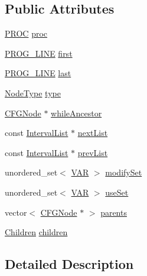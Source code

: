 \subsection*{Public Attributes}
\begin{DoxyCompactItemize}
\item 
\hyperlink{std_afx_8h_aa07ea1d188c7b45668f1bd82ffd6d87e}{P\-R\-O\-C} \hyperlink{class_c_f_g_node_a4c29d551dc1b8ac7465ebf4ddd1e3437}{proc}
\item 
\hyperlink{std_afx_8h_abcc2d0120d16c2587a85b314010f6399}{P\-R\-O\-G\-\_\-\-L\-I\-N\-E} \hyperlink{class_c_f_g_node_a916b31fb1fc28e3a708d3c7913970f66}{first}
\item 
\hyperlink{std_afx_8h_abcc2d0120d16c2587a85b314010f6399}{P\-R\-O\-G\-\_\-\-L\-I\-N\-E} \hyperlink{class_c_f_g_node_aa2ed16b97347a8daa3ae6a7b0022284b}{last}
\item 
\hyperlink{class_c_f_g_node_aa0933713506a9c0226e705703ee5b079}{Node\-Type} \hyperlink{class_c_f_g_node_a71c611eee5b784222a2c51b7a7b6d169}{type}
\item 
\hyperlink{class_c_f_g_node}{C\-F\-G\-Node} $\ast$ \hyperlink{class_c_f_g_node_ade810133e14d7229080fae4b61c4c996}{while\-Ancestor}
\item 
const \hyperlink{class_interval_list}{Interval\-List} $\ast$ \hyperlink{class_c_f_g_node_aa6b60346fb038bfd0c1f1b5d10164fcb}{next\-List}
\item 
const \hyperlink{class_interval_list}{Interval\-List} $\ast$ \hyperlink{class_c_f_g_node_afd5d0654a254ef7a1c62e47d7ff66f75}{prev\-List}
\item 
unordered\-\_\-set$<$ \hyperlink{std_afx_8h_a3112e3faf0465bb5d85272a347b7f2f1}{V\-A\-R} $>$ \hyperlink{class_c_f_g_node_a2b140c15b8d43b8af5245731b99d1f2c}{modify\-Set}
\item 
unordered\-\_\-set$<$ \hyperlink{std_afx_8h_a3112e3faf0465bb5d85272a347b7f2f1}{V\-A\-R} $>$ \hyperlink{class_c_f_g_node_aa30a2f657ae1827572d1c6a934a60635}{use\-Set}
\item 
vector$<$ \hyperlink{class_c_f_g_node}{C\-F\-G\-Node} $\ast$ $>$ \hyperlink{class_c_f_g_node_a9c9bf36df87bdf73c6aa507f52efc702}{parents}
\item 
\hyperlink{union_c_f_g_node_1_1_children}{Children} \hyperlink{class_c_f_g_node_a47d7f27cf88007b5663eae31f903f95a}{children}
\end{DoxyCompactItemize}


\subsection{Detailed Description}


